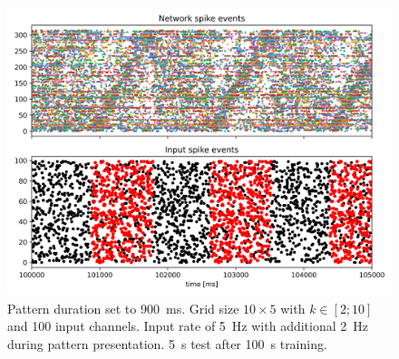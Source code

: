 \begin{figure}[htbp]
    \centering
    \includegraphics[width=\columnwidth]{Figures/nest_experiment_900ms.png}
    \caption{Pattern duration set to \SI{900}{\milli\second}. Grid size $10\times 5$ with $k\in[2;10]$ and 100 input channels. Input rate of \SI{5}{\hertz} with additional \SI{2}{\hertz} during pattern presentation. \SI{5}{\second} test after \SI{100}{\second} training.}
    \label{fig:nest_experiment_900ms}
\end{figure}










